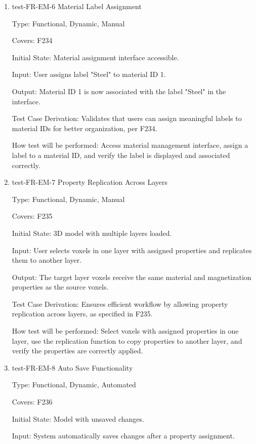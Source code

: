 \documentclass[12pt, titlepage]{article}
\begin{document}
\begin{enumerate}
\item{test-FR-EM-6 Material Label Assignment\\}

Type: Functional, Dynamic, Manual

Covers: F234
					
Initial State: Material assignment interface accessible.
					
Input: User assigns label "Steel" to material ID 1.
					
Output: Material ID 1 is now associated with the label "Steel" in the interface.

Test Case Derivation: Validates that users can assign meaningful labels to material IDs for better organization, per F234.
					
How test will be performed: Access material management interface, assign a label to a material ID, and verify the label is displayed and associated correctly.

\item{test-FR-EM-7 Property Replication Across Layers\\}

Type: Functional, Dynamic, Manual

Covers: F235
					
Initial State: 3D model with multiple layers loaded.
					
Input: User selects voxels in one layer with assigned properties and replicates them to another layer.
					
Output: The target layer voxels receive the same material and magnetization properties as the source voxels.

Test Case Derivation: Ensures efficient workflow by allowing property replication across layers, as specified in F235.
					
How test will be performed: Select voxels with assigned properties in one layer, use the replication function to copy properties to another layer, and verify the properties are correctly applied.

\item{test-FR-EM-8 Auto Save Functionality\\}

Type: Functional, Dynamic, Automated

Covers: F236
					
Initial State: Model with unsaved changes.
					
Input: System automatically saves changes after a property assignment.
					

\end{enumerate}
\end{document}
